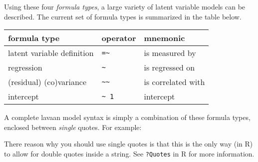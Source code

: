 Using these four \emph{formula types}, a large variety of latent
variable models can be described. The current set of formula types is
summarized in the table below.

\begin{longtable}[]{@{}lll@{}}
\toprule
formula type & operator & mnemonic \\
\midrule
\endhead
latent variable definition & \texttt{=\textasciitilde{}} & is measured
by \\
regression & \texttt{\textasciitilde{}} & is regressed on \\
(residual) (co)variance & \texttt{\textasciitilde{}\textasciitilde{}} &
is correlated with \\
intercept & \texttt{\textasciitilde{}\ 1} & intercept \\
\bottomrule
\end{longtable}

A complete lavaan model syntax is simply a combination of these formula
types, enclosed between \emph{single} quotes. For example:

\begin{Shaded}
\begin{Highlighting}[]
\OtherTok{\textless{}{-}} 



\StringTok{           \textquotesingle{}}
\end{Highlighting}
\end{Shaded}

There reason why you should use single quotes is that this is the only
way (in R) to allow for double quotes inside a string. See
\texttt{?Quotes} in R for more information.

